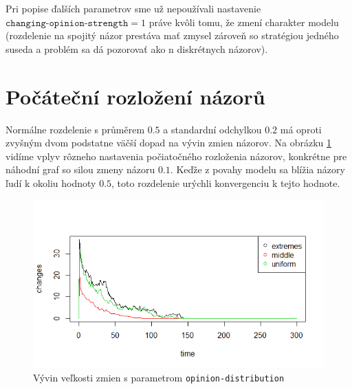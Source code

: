 \documentclass[10pt,a4paper]{report}
\begin{document}
Pri popise ďalších parametrov sme už nepoužívali nastavenie $\texttt{changing-opinion-strength} = 1$ práve kvôli tomu, že zmení charakter modelu (rozdelenie na spojitý názor prestáva mať zmysel zároveň so stratégiou jedného suseda a problém sa dá pozorovať ako n diskrétnych názorov).

\section{Počáteční rozložení názorů}
Normálne rozdelenie s průměrem $0.5$ a standardní odchylkou $0.2$ má oproti zvyšným dvom podstatne väčší dopad na vývin zmien názorov. Na obrázku \ref{fig:zmeny-rozlozeni} vidíme vplyv rôzneho nastavenia počiatočného rozloženia názorov, konkrétne pre náhodní graf so silou zmeny názoru $0.1$. Keďže z povahy modelu sa blížia názory ľudí k okoliu hodnoty $0.5$, toto rozdelenie urýchli konvergenciu k tejto hodnote.
\begin{figure}
  \includegraphics[width=\textwidth]{plots/small-world-g/smallWorldDistribution.png}
  \caption{Vývin veľkosti zmien s parametrom \texttt{opinion-distribution} }
  \label{fig:zmeny-rozlozeni}
\end{figure}
\end{document}
